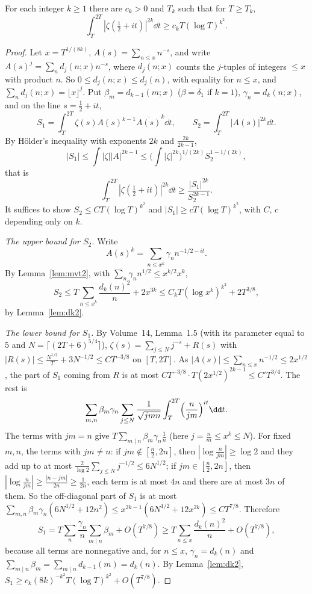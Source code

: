 \begin{theorem}\label{thm:momentlower}
For each integer $k\ge1$ there are $c_k>0$ and $T_k$ such that for $T\ge T_k$,
\[
\int_T^{2T}|\zeta(\tfrac12+it)|^{2k}\dd t\ge c_kT(\log T)^{k^2}.
\]
\end{theorem}
\begin{proof}
Let $x=T^{1/(8k)}$, $A(s)=\sum_{n\le x}n^{-s}$, and write $A(s)^j=\sum_nd_j(n;x)n^{-s}$, where $d_j(n;x)$ counts the $j$-tuples of integers $\le x$ with product $n$. So $0\le d_j(n;x)\le d_j(n)$, with equality for $n\le x$, and $\sum_nd_j(n;x)=\lfloor x\rfloor^j$. Put $\beta_m=d_{k-1}(m;x)$ ($\beta=\delta_1$ if $k=1$), $\gamma_n=d_k(n;x)$, and on the line $s=\frac12+it$,
\[
S_1=\int_T^{2T}\zeta(s)A(s)^{k-1}\overline{A(s)}^k\dd t,\qquad S_2=\int_T^{2T}|A(s)|^{2k}\dd t.
\]
By Hölder's inequality with exponents $2k$ and $\frac{2k}{2k-1}$,
\[
|S_1|\le\int|\zeta||A|^{2k-1}\le\bigl(\int|\zeta|^{2k}\bigr)^{1/(2k)}S_2^{1-1/(2k)},
\]
that is
\[
\int_T^{2T}|\zeta(\tfrac12+it)|^{2k}\dd t\ge\frac{|S_1|^{2k}}{S_2^{2k-1}}.
\]
It suffices to show $S_2\le C T(\log T)^{k^2}$ and $|S_1|\ge cT(\log T)^{k^2}$, with $C$, $c$ depending only on $k$.

\emph{The upper bound for $S_2$.} Write
\[
A(s)^k=\sum_{n\le x^k}\gamma_nn^{-1/2-it}.
\]
By Lemma~\ref{lem:mvt2}, with $\sum_n\gamma_nn^{1/2}\le x^{k/2}x^k$,
\[
S_2\le T\sum_{n\le x^k}\frac{d_k(n)^2}n+2x^{3k}\le C_kT(\log x^k)^{k^2}+2T^{3/8},
\]
by Lemma~\ref{lem:dk2}.

\emph{The lower bound for $S_1$.} By Volume~14, Lemma~1.5 (with its parameter equal to $5$ and $N=\lceil(2T+6)^{5/4}\rceil$), $\zeta(s)=\sum_{j\le N}j^{-s}+R(s)$ with $|R(s)|\le\frac{N^{1/2}}T+3N^{-1/2}\le CT^{-3/8}$ on $[T,2T]$. As $|A(s)|\le\sum_{n\le x}n^{-1/2}\le2x^{1/2}$, the part of $S_1$ coming from $R$ is at most $CT^{-3/8}\cdot T(2x^{1/2})^{2k-1}\le C'T^{3/4}$. The rest is
\[
\sum_{m,n}\beta_m\gamma_n\sum_{j\le N}\frac1{\sqrt{jmn}}\int_T^{2T}\Bigl(\frac n{jm}\Bigr)^{it}\dd t.
\]
The terms with $jm=n$ give $T\sum_{m\mid n}\beta_m\gamma_n\frac1n$ (here $j=\frac nm\le x^k\le N$). For fixed $m,n$, the terms with $jm\ne n$: if $jm\notin[\frac n2,2n]$, then $|\log\frac n{jm}|\ge\log2$ and they add up to at most $\frac2{\log2}\sum_{j\le N}j^{-1/2}\le6N^{1/2}$; if $jm\in[\frac n2,2n]$, then $|\log\frac n{jm}|\ge\frac{|n-jm|}{2n}\ge\frac1{2n}$, each term is at most $4n$ and there are at most $3n$ of them. So the off-diagonal part of $S_1$ is at most $\sum_{m,n}\beta_m\gamma_n(6N^{1/2}+12n^2)\le x^{2k-1}(6N^{1/2}+12x^{2k})\le CT^{7/8}$. Therefore
\[
S_1=T\sum_n\frac{\gamma_n}n\sum_{m\mid n}\beta_m+O(T^{7/8})\ge T\sum_{n\le x}\frac{d_k(n)^2}n+O(T^{7/8}),
\]
because all terms are nonnegative and, for $n\le x$, $\gamma_n=d_k(n)$ and $\sum_{m\mid n}\beta_m=\sum_{m\mid n}d_{k-1}(m)=d_k(n)$. By Lemma~\ref{lem:dk2}, $S_1\ge c_k(8k)^{-k^2}T(\log T)^{k^2}+O(T^{7/8})$.
\end{proof}

